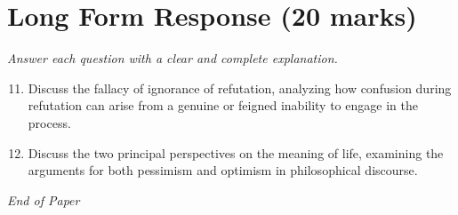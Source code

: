 \documentclass[12pt]{article}
\begin{document}
\section*{Long Form Response (20 marks)}
\textit{Answer each question with a clear and complete explanation.}
\begin{enumerate}[label=\arabic*.]
\setcounter{enumi}{10}
\item Discuss the fallacy of ignorance of refutation, analyzing how confusion during refutation can arise from a genuine or feigned inability to engage in the process.
\item Discuss the two principal perspectives on the meaning of life, examining the arguments for both pessimism and optimism in philosophical discourse.
\end{enumerate}

\vfill
\noindent\textit{End of Paper}
\end{document}
